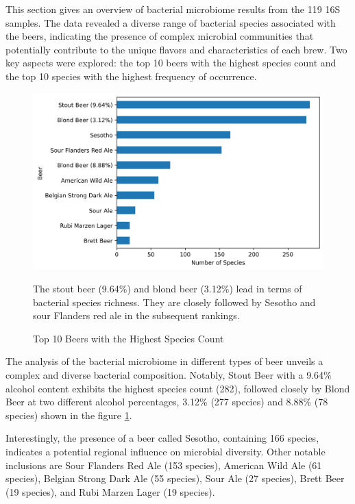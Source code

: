 This section gives an overview of bacterial microbiome results from the 119 16S samples. The data revealed a diverse range of bacterial species associated with the beers, indicating the presence of complex microbial communities that potentially contribute to the unique flavors and characteristics of each brew. Two key aspects were explored: the top 10 beers with the highest species count and the top 10 species with the highest frequency of occurrence.

    \begin{figure}[H]
        \centering
        \includegraphics[scale=0.7]{images/overview/top10_beers_bac.png}
        \caption{Top 10 Beers with the Highest Species Count}
        \small The stout beer (9.64\%) and blond beer (3.12\%) lead in terms of bacterial species richness. They are closely followed by Sesotho and sour Flanders red ale in the subsequent rankings.
        \label{fig:results:top10_beer_bacterial}
    \end{figure}

The analysis of the bacterial microbiome in different types of beer unveils a complex and diverse bacterial composition. Notably, Stout Beer with a 9.64\% alcohol content exhibits the highest species count (282), followed closely by Blond Beer at two different alcohol percentages, 3.12\% (277 species) and 8.88\% (78 species) shown in the figure \ref{fig:results:top10_beer_bacterial}.

Interestingly, the presence of a beer called Sesotho, containing 166 species, indicates a potential regional influence on microbial diversity. Other notable inclusions are Sour Flanders Red Ale (153 species), American Wild Ale (61 species), Belgian Strong Dark Ale (55 species), Sour Ale (27 species), Brett Beer (19 species), and Rubi Marzen Lager (19 species).

